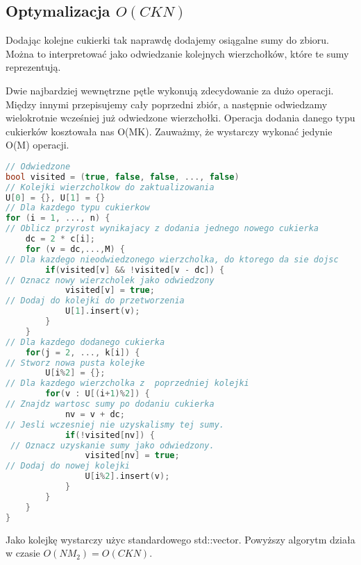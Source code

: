 \documentclass[paper=a4, fontsize=11pt]{article}
\begin{document}
\subsection{Optymalizacja $O(CKN)$}
\begin{observation} Dodając kolejne cukierki tak naprawdę dodajemy osiągalne sumy do zbioru. Można to interpretować jako odwiedzanie kolejnych wierzchołków, które te sumy reprezentują.
\end{observation}

\begin{observation} Dwie najbardziej wewnętrzne pętle wykonują zdecydowanie za dużo operacji. Między innymi przepisujemy cały poprzedni zbiór, a następnie odwiedzamy wielokrotnie wcześniej już odwiedzone wierzchołki. Operacja dodania danego typu cukierków kosztowała nas O(MK). Zauważmy, że wystarczy wykonać jedynie O(M) operacji.
\end{observation}


\begin{lstlisting}[language=c++, breaklines=True]
// Odwiedzone
bool visited = (true, false, false, ..., false)
// Kolejki wierzcholkow do zaktualizowania
U[0] = {}, U[1] = {} 
// Dla kazdego typu cukierkow
for (i = 1, ..., n) {
// Oblicz przyrost wynikajacy z dodania jednego nowego cukierka
	dc = 2 * c[i];
	for (v = dc,...,M) {
// Dla kazdego nieodwiedzonego wierzcholka, do ktorego da sie dojsc
		if(visited[v] && !visited[v - dc]) {
// Oznacz nowy wierzcholek jako odwiedzony
			visited[v] = true;
// Dodaj do kolejki do przetworzenia
			U[1].insert(v);
		}
	}
// Dla kazdego dodanego cukierka
	for(j = 2, ..., k[i]) {
// Stworz nowa pusta kolejke
		U[i%2] = {};
// Dla kazdego wierzcholka z  poprzedniej kolejki
		for(v : U[(i+1)%2]) {
// Znajdz wartosc sumy po dodaniu cukierka
			nv = v + dc; 
// Jesli wczesniej nie uzyskalismy tej sumy.
			if(!visited[nv]) {
 // Oznacz uzyskanie sumy jako odwiedzony.
				visited[nv] = true;
// Dodaj do nowej kolejki
				U[i%2].insert(v);
			}			
		}
	}
}
\end{lstlisting}
Jako kolejkę wystarczy użyc standardowego std::vector.
Powyższy algorytm działa w czasie $O(NM_2) = O(CKN)$.
\end{document}
